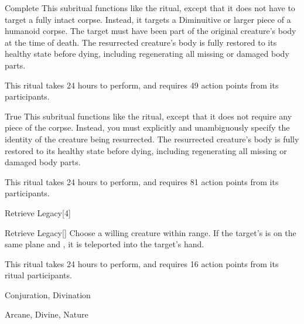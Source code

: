 \begin{ability}[\nth{7}]{Complete}
This subritual functions like the  ritual, except that it does not have to target a fully intact corpse.
Instead, it targets a Diminuitive or larger piece of a humanoid corpse.
The target must have been part of the original creature's body at the time of death.
The resurrected creature's body is fully restored to its healthy state before dying, including regenerating all missing or damaged body parts.

This ritual takes 24 hours to perform, and requires 49 action points from its participants.
\end{ability}
\vspace{0.25em}


\begin{ability}[\nth{9}]{True}
This subritual functions like the  ritual, except that it does not require any piece of the corpse.
Instead, you must explicitly and unambiguously specify the identity of the creature being resurrected.
The resurrected creature's body is fully restored to its healthy state before dying, including regenerating all missing or damaged body parts.

This ritual takes 24 hours to perform, and requires 81 action points from its participants.
\end{ability}
\vspace{0.25em}


\begin{spellsection}{Retrieve Legacy}[4]


\begin{ability}{Retrieve Legacy}[]
Choose a willing creature within \rngclose range.
If the target's  is on the same plane and , it is teleported into the target's hand.

This ritual takes 24 hours to perform, and requires 16 action points from its ritual participants.
\end{ability}




 Conjuration, Divination

 Arcane, Divine, Nature
\end{spellsection}



